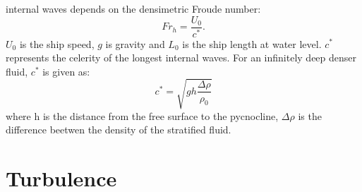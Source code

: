 \documentclass[a4paper, 12pt]{report}
\begin{document}
internal waves depends on the densimetric Froude number:
\begin{equation}
Fr_h = \frac{U_0}{c^*}.
\label{eqn:densimetricFroudeNumber}
\end{equation}
$U_0$ is the ship speed, $g$ is gravity and $L_0$ is the ship length at water level. $c^*$ represents the celerity of the longest internal waves. For an infinitely deep denser fluid, $c^*$ is given as:
\begin{equation}
c^* = \sqrt{gh\frac{\Delta \rho}{\rho_0}}
\label{eqn:celerityWaves}
\end{equation} 
where h is the distance from the free surface to the pycnocline, $\Delta \rho$ is the difference beetwen the density of the stratified fluid.
\section{Turbulence}
\end{document}
